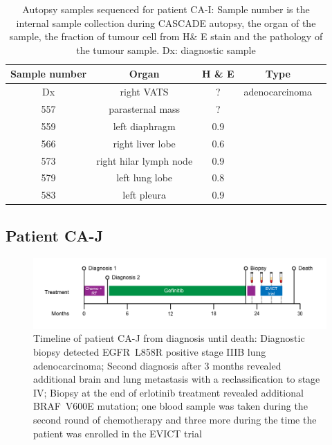 \begin{table}[ht]
\caption[Autopsy samples sequenced for patient CA-I]{Autopsy samples sequenced for patient CA-I: Sample number is the internal sample collection during CASCADE autopsy, the organ of the sample, the fraction of tumour cell from H\& E stain and the pathology of the tumour sample. Dx: diagnostic sample}\label{tab:ca51wesSamples}
\centering
{}
\begin{tabular}{|c|c|c|c|c|}
\toprule
\hline
 \rowcolor{gray!50}
\textbf{Sample number} & \textbf{Organ} & \textbf{H \& E} & \textbf{Type}\\
\hline
 Dx & right VATS & ? &  adenocarcinoma \\
 557 & parasternal mass & ? & \cellcolor{gray!15} \\
 559 & left diaphragm & 0.9 & \cellcolor{gray!15} \\
 566 & right liver lobe & 0.6 & \cellcolor{gray!15} \\
 573 & right hilar lymph node & 0.9 & \cellcolor{gray!15} \\
 579 & left lung lobe & 0.8 & \cellcolor{gray!15} \\
 583 & left pleura & 0.9 & \cellcolor{gray!15}\multirow{-6}{*}{small cell} \\
 \hline
\bottomrule
\end{tabular}
\end{table} 



\cleardoublepage

\subsection{Patient CA-J}
\label{cascade-sec:CA80}


\begin{figure}[ht]
\centering
\includegraphics[width=.99\linewidth]{Figures/CASCADE/CA80/CA-J_timeline}
\caption[Timeline of patient CA-J from diagnosis until death]{Timeline of patient CA-J from diagnosis until death: Diagnostic biopsy detected EGFR~L858R positive stage IIIB lung adenocarcinoma; Second diagnosis after 3 months revealed additional brain and lung metastasis with a reclassification to stage IV; Biopsy at the end of erlotinib treatment revealed additional BRAF~V600E mutation; one blood sample was taken during the second round of chemotherapy and three more during the time the patient was enrolled in the EVICT trial} \label{fig:ca80timeline}
\end{figure}





